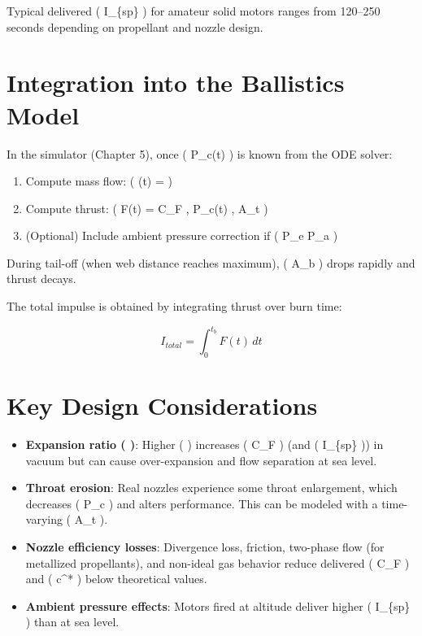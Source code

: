 \documentclass[
  letterpaper,
  DIV=11,
  numbers=noendperiod]{scrreprt}
\providecommand{\tightlist}{%
  \setlength{\itemsep}{0pt}\setlength{\parskip}{0pt}}
\begin{document}
Typical delivered ( I\_\{sp\} ) for amateur solid motors ranges from
120--250 seconds depending on propellant and nozzle design.

\section{Integration into the Ballistics
Model}\label{integration-into-the-ballistics-model}

In the simulator (Chapter 5), once ( P\_c(t) ) is known from the ODE
solver:

\begin{enumerate}
\def\labelenumi{\arabic{enumi}.}
\tightlist
\item
  Compute mass flow: ( (t) =  )
\item
  Compute thrust: ( F(t) = C\_F , P\_c(t) , A\_t )
\item
  (Optional) Include ambient pressure correction if ( P\_e \neq P\_a )
\end{enumerate}

During tail-off (when web distance reaches maximum), ( A\_b ) drops
rapidly and thrust decays.

The total impulse is obtained by integrating thrust over burn time:

\[
I_{total} = \int_0^{t_b} F(t) \, dt
\]

\section{Key Design Considerations}\label{key-design-considerations}

\begin{itemize}
\tightlist
\item
  \textbf{Expansion ratio ( \epsilon )}: Higher ( \epsilon ) increases (
  C\_F ) (and ( I\_\{sp\} )) in vacuum but can cause over-expansion and
  flow separation at sea level.
\item
  \textbf{Throat erosion}: Real nozzles experience some throat
  enlargement, which decreases ( P\_c ) and alters performance. This can
  be modeled with a time-varying ( A\_t ).
\item
  \textbf{Nozzle efficiency losses}: Divergence loss, friction,
  two-phase flow (for metallized propellants), and non-ideal gas
  behavior reduce delivered ( C\_F ) and ( c\^{}* ) below theoretical
  values.
\item
  \textbf{Ambient pressure effects}: Motors fired at altitude deliver
  higher ( I\_\{sp\} ) than at sea level.
\end{itemize}
\end{document}
